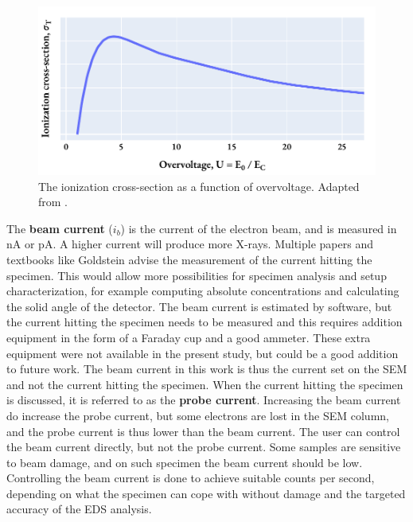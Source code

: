 \begin{figure}[hbt]
    \centering
    \includegraphics[width=0.6\linewidth]{figures/overvoltage2ionizationcrosssection.pdf}
    \caption{
        The ionization cross-section as a function of overvoltage.
        Adapted from \cite[Fig. 4.4]{williams_carter_tem_2009}.
    }
    \label{fig:overvoltage2ionizationcrosssection}
\end{figure}








The \textbf{beam current} ($i_b$) is the current of the electron beam, and is measured in nA or pA.
A higher current will produce more X-rays.
Multiple papers and textbooks like Goldstein advise the measurement of the current hitting the specimen.
This would allow more possibilities for specimen analysis and setup characterization, for example computing absolute concentrations and calculating the solid angle of the detector.
The beam current is estimated by software, but the current hitting the specimen needs to be measured and this requires addition equipment in the form of a Faraday cup and a good ammeter.
These extra equipment were not available in the present study, but could be a good addition to future work.
The beam current in this work is thus the current set on the SEM and not the current hitting the specimen.
When the current hitting the specimen is discussed, it is referred to as the \textbf{probe current}.
Increasing the beam current do increase the probe current, but some electrons are lost in the SEM column, and the probe current is thus lower than the beam current.
The user can control the beam current directly, but not the probe current.
Some samples are sensitive to beam damage, and on such specimen the beam current should be low.
Controlling the beam current is done to achieve suitable counts per second, depending on what the specimen can cope with without damage and the targeted accuracy of the EDS analysis.


